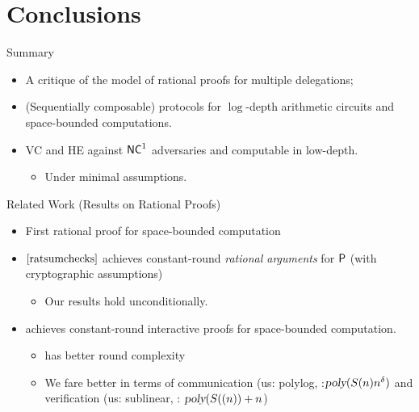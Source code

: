 \section{Conclusions}

\begin{frame}{Summary}
		\begin{itemize}[<+- | alert@+>]	
			\item A critique of the model of rational proofs for multiple delegations;
			\item (Sequentially composable) protocols for $\log$-depth arithmetic circuits and space-bounded computations.
			\item VC and HE against $\NC^1$ adversaries and computable in low-depth.
			\begin{itemize}
				\item Under minimal assumptions.
			\end{itemize}
		\end{itemize}
\end{frame}

\begin{frame}{Related Work (Results on Rational Proofs)}
\begin{itemize}[<+- | alert@+>]
	\item First rational proof for space-bounded computation
	\item $\cite{ratsumchecks}$ achieves constant-round \textit{rational arguments} for $\P$ (with cryptographic assumptions)
	\begin{itemize}
		\item Our results hold unconditionally.
	\end{itemize}
	\item \cite{rrr16} achieves constant-round interactive proofs for space-bounded computation.
	\begin{itemize}
		\item \cite{rrr16} has better round complexity
		\item We fare better in terms of communication (us: polylog, \cite{rrr16}:$\poly(S(n)n^{\delta})$ and verification (us: sublinear, \cite{rrr16}: $\poly(S((n)) + n$)
	\end{itemize}
\end{itemize}
\end{frame}


